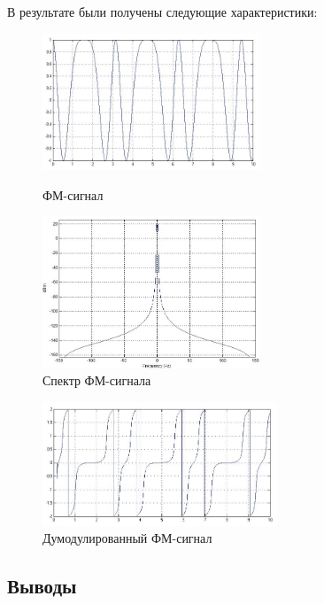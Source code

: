 \documentclass[10pt,a4paper]{article}
\begin{document}
В результате были получены следующие характеристики:
\begin{figure}[h]\centering
  \parbox[b]{0.49\textwidth}{\centering
    \includegraphics[width=6.5cm]{sim_pm} 
    \caption{ФМ-сигнал}\label{fig.sim_pm}}
  \hfil\hfil 
  \begin{minipage}[b]{0.49\textwidth}
	\centering
	\includegraphics[width=6.5cm]{sim_pms}
	\caption{Спектр ФМ-сигнала}\label{fig.sim_pms} 
  \end{minipage}
\end{figure}

\begin{figure}[h]\centering
    \includegraphics[width=7cm]{sim_pdm} 
    \caption{Думодулированный ФМ-сигнал}\label{fig.sim_pdm}
\end{figure}
\FloatBarrier
\subsection{Выводы}
\end{document}
